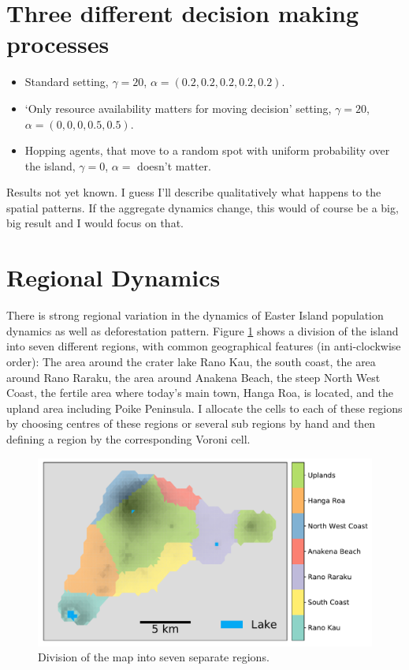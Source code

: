 \section{Three different decision making processes}
\begin{itemize}
	\item Standard setting, $\gamma=20$, $\alpha=(0.2,0.2,0.2,0.2,0.2)$.
	\item `Only resource availability matters for moving decision' setting, $\gamma=20$, $\alpha=(0, 0, 0, 0.5,0.5)$.
	\item Hopping agents, that move to a random spot with uniform probability over the island, $\gamma=0$, $\alpha=$ doesn't matter.
\end{itemize}
Results not yet known. I guess I'll describe qualitatively what happens to the spatial patterns. 
If the aggregate dynamics change, this would of course be a big, big result and I would focus on that.


\section{Regional Dynamics}
There is strong regional variation in the dynamics of Easter Island population dynamics as well as deforestation pattern. 
Figure \ref{fig:mapregionscoarse} shows a division of the island into seven different regions, with common geographical features (in anti-clockwise order): The area around the crater lake Rano Kau, the south coast, the area around Rano Raraku, the area around Anakena Beach, the steep North West Coast, the fertile area where today's main town, Hanga Roa, is located, and the upland area including Poike Peninsula. 
I allocate the cells to each of these regions by choosing centres of these regions or several sub regions by hand and then defining a region by the corresponding Voroni cell.

\begin{figure}
	\centering
	\includegraphics[width=1.0\linewidth]{images/Results/Standard/MapRegionsCoarse}
	\caption{Division of the map into seven separate regions.}
	\label{fig:mapregionscoarse}
\end{figure}

